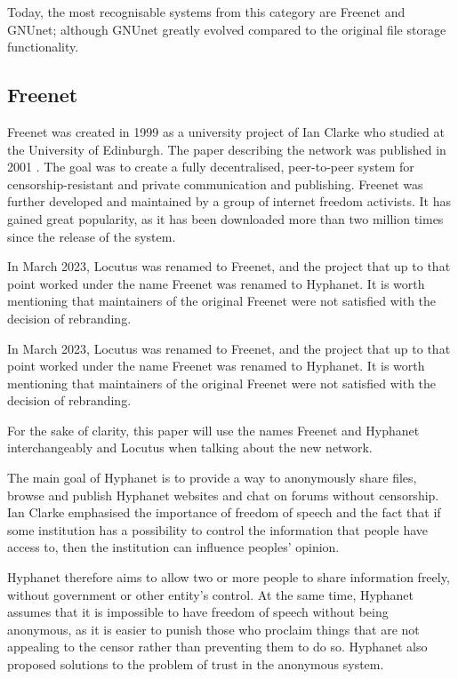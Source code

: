 Today, the most recognisable systems from this category are Freenet and GNUnet; although GNUnet greatly evolved compared to the original file storage functionality.

\subsection{Freenet}
Freenet was created in 1999 as a university project of Ian Clarke who studied at the University of Edinburgh. The paper describing the network was published in 2001 \cite{freenet}. The goal was to create a fully decentralised, peer-to-peer system for censorship-resistant and private communication and publishing. Freenet was further developed and maintained by a group of internet freedom activists. It has gained great popularity, as it has been downloaded more than two million times since the release of the system.

In March 2023, Locutus was renamed to Freenet, and the project that up to that point worked under the name Freenet was renamed to Hyphanet. It is worth mentioning that maintainers of the original Freenet were not satisfied with the decision of rebranding.

In March 2023, Locutus was renamed to Freenet, and the project that up to that point worked under the name Freenet was renamed to Hyphanet. It is worth mentioning that maintainers of the original Freenet were not satisfied with the decision of rebranding.

For the sake of clarity, this paper will use the names Freenet and Hyphanet interchangeably and Locutus when talking about the new network.

The main goal of Hyphanet is to provide a way to anonymously share files, browse and publish Hyphanet websites and chat on forums without censorship. Ian Clarke emphasised the importance of freedom of speech and the fact that if some institution has a possibility to control the information that people have access to, then the institution can influence peoples’ opinion.

Hyphanet therefore aims to allow two or more people to share information freely, without government or other entity’s control.
At the same time, Hyphanet assumes that it is impossible to have freedom of speech without being anonymous, as it is easier to punish those who proclaim things that are not appealing to the censor rather than preventing them to do so. Hyphanet also proposed solutions to the problem of trust in the anonymous system.

